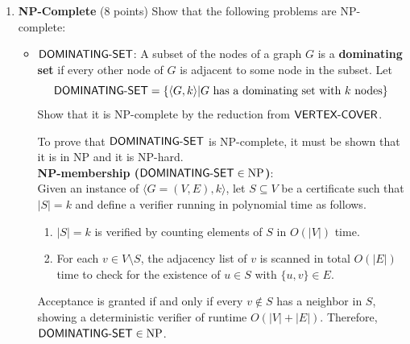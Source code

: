 \begin{enumerate}
\begin{prove}
\begin{enumerate}
          
    \end{enumerate}
    Therefore, it has been shown that $x \in A \leftrightarrow f(x) \in L$.

    Thus, \(f\) is a valid polynomial-time reduction from \(A\) to \(L\), that is, 
    \(A \le^p_m L\). Since \(A\) was chosen arbitrarily in \(\mathrm{NP}\), it 
    follows that \(L\) is NP-hard. (\(A\) can be arbitrarily set to a NP-hard problem.) 
    Therefore, \(L\) is NP-complete.
    Thus, under the assumption 
    \(\mathrm{P} = \mathrm{NP}\), every \(L \in \mathrm{P}\) 
    is NP‐complete except for $\emptyset$ and $\Sigma^*$.
    \end{prove}
        
        


















    \item \textbf{NP-Complete} (8 points)
    Show that the following problems are NP-complete:
    \begin{itemize}
        \item $\textsf{DOMINATING-SET}$: A subset of the nodes of a graph 
        $G$ is a \textbf{dominating set} if every other node of 
        $G$ is adjacent to some node in the subset. Let 
        $$\textsf{DOMINATING-SET} = \{\langle G,k \rangle | G 
        \text{ has a dominating set with } k \text{ nodes}\}$$
        Show that it is NP-complete by the reduction from $\textsf{VERTEX-COVER}$.
        \begin{subprove}
        To prove that $\textsf{DOMINATING-SET}$ is NP-complete, 
        it must be shown that it is in NP and it is NP-hard.\\

        \textbf{NP-membership (\(\textsf{DOMINATING-SET}\in\mathrm{NP}\))}:\\
        Given an instance of \(\langle G=(V,E),k\rangle\), let \(S\subseteq V\) be a certificate 
        such that \(|S| = k\) and define a verifier running 
        in polynomial time as follows.
        \begin{enumerate}
            \item \(\lvert S\rvert = k\) is verified by counting elements of 
            \(S\) in \(O(|V|)\) time.
            \item For each \(v\in V\setminus S\), the adjacency list of \(v\) 
            is scanned in total \(O(|E|)\) time to check for the existence of 
            \(u\in S\) with \(\{u,v\}\in E\).
        \end{enumerate}
        Acceptance is granted if and only if every \(v\notin S\) 
        has a neighbor in \(S\), 
        showing a deterministic verifier of runtime \(O(|V|+|E|)\).
        Therefore, \(\textsf{DOMINATING-SET}\in\mathrm{NP}\). \\


\end{subprove}
\end{itemize}
\end{enumerate}
